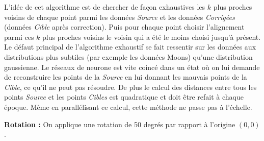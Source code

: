 L'idée de cet algorithme est de chercher de façon exhaustives les $k$ plus proches voisins de chaque point
parmi les données \emph{Source} et les données \emph{Corrigées} (données \emph{Cible} après correction).
Puis pour chaque point choisir l'alignement parmi ces $k$ plus proches voisins le voisin qui a été le moins choisi jusqu'à présent.
Le défaut principal de l'algorithme exhaustif se fait ressentir sur les données aux distributions plus subtiles
(par exemple les données Moons) qu'une distribution gaussienne. Le réseaux de neurone est vite coincé dans 
un état où on lui demande de reconstruire les points de la \emph{Source} en lui donnant les mauvais points
de la \emph{Cible}, ce qu'il ne peut pas résoudre.
De plus le calcul des distances entre tous les points \textit{Source} et les points \textit{Cibles} est quadratique
et doit être refait à chaque époque. Même en parallélisant ce calcul, cette méthode ne passe pas à l'échelle.

{\Large \textbf{Rotation :}} On applique une rotation de 50 degrés par rapport à l'origine $(0,0)$.

